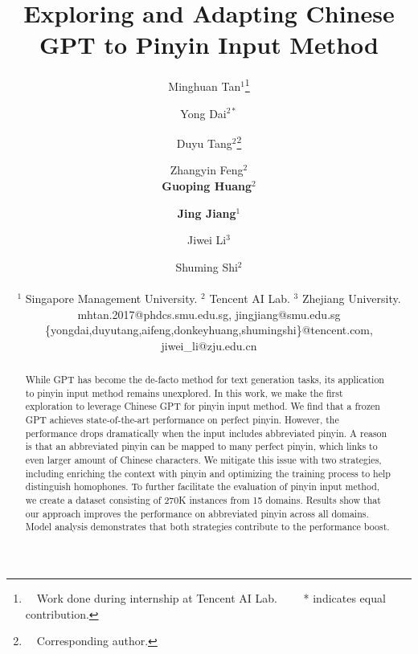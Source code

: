 \documentclass[11pt]{article}
\title{Exploring and Adapting Chinese GPT to  Pinyin Input Method}
\author{
Minghuan Tan$^1$\thanks{~~Work done during internship at Tencent AI Lab. ~~~~* indicates equal contribution.} \and
Yong Dai$^{2*}$\and
Duyu Tang$^2$\thanks{~~Corresponding author.}\and
Zhangyin Feng$^2$ \\
\bf{Guoping Huang}$^2$ \and 
\bf{Jing Jiang}$^1$ \and
Jiwei Li$^3$  \and
Shuming Shi$^2$
\\ \\
$^1$ Singapore Management University.
$^2$ Tencent AI Lab.
$^3$  Zhejiang University.\\
mhtan.2017@phdcs.smu.edu.sg, jingjiang@smu.edu.sg \\
\{yongdai,duyutang,aifeng,donkeyhuang,shumingshi\}@tencent.com,  
jiwei\_li@zju.edu.cn
}
\begin{document}
\maketitle
\begin{CJK*}{UTF8}{gbsn}

\begin{abstract}
While GPT has become the de-facto method for text generation tasks, its application to pinyin input method remains unexplored.
In this work, we make the first exploration to leverage Chinese GPT for pinyin input method.
We find that a frozen GPT achieves state-of-the-art performance on perfect pinyin.
However, the performance drops dramatically when the input includes abbreviated pinyin.
A reason is that an abbreviated pinyin can be mapped to many perfect pinyin, which links to even larger amount of Chinese characters.
We mitigate this issue with two strategies,
including enriching the context with pinyin and optimizing the training process to help distinguish homophones. 
To further facilitate the evaluation of pinyin input method, we create a dataset consisting of 270K instances from 15 domains.
Results show that our approach improves the performance on abbreviated pinyin across all domains.
Model analysis demonstrates that both strategies
contribute to the performance boost.
\end{abstract}

\vspace{0.01cm}



% 
% 








\appendix


\end{CJK*}
\end{document}
